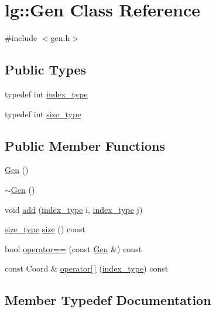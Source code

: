 \hypertarget{classlg_1_1Gen}{}\section{lg\+:\+:Gen Class Reference}
\label{classlg_1_1Gen}


{\ttfamily \#include $<$gen.\+h$>$}

\subsection*{Public Types}
\begin{DoxyCompactItemize}
\item 
typedef int \hyperlink{classlg_1_1Gen_a3a4bd3c1cacde31b1b181be8fdd9d81e}{index\+\_\+type}
\item 
typedef int \hyperlink{classlg_1_1Gen_ae8c2f6b6ba291d5c24cfc9f3d24789b8}{size\+\_\+type}
\end{DoxyCompactItemize}
\subsection*{Public Member Functions}
\begin{DoxyCompactItemize}
\item 
\hyperlink{classlg_1_1Gen_a33423152405010c7a733a17aaec8a9c6}{Gen} ()
\item 
\hyperlink{classlg_1_1Gen_a527d2e9ac6e2f05071f0c148d7376f91}{$\sim$\+Gen} ()
\item 
void \hyperlink{classlg_1_1Gen_a3fd2f13a308fd1009839ca80b94370e5}{add} (\hyperlink{classlg_1_1Gen_a3a4bd3c1cacde31b1b181be8fdd9d81e}{index\+\_\+type} i, \hyperlink{classlg_1_1Gen_a3a4bd3c1cacde31b1b181be8fdd9d81e}{index\+\_\+type} j)
\item 
\hyperlink{classlg_1_1Gen_ae8c2f6b6ba291d5c24cfc9f3d24789b8}{size\+\_\+type} \hyperlink{classlg_1_1Gen_ae3d573f57b359a51dd1849d3976d43cd}{size} () const 
\item 
bool \hyperlink{classlg_1_1Gen_a004534f31f08a0c47627f4287e81d640}{operator==} (const \hyperlink{classlg_1_1Gen}{Gen} \&) const 
\item 
const Coord \& \hyperlink{classlg_1_1Gen_ad59885d3afc595e8aed53ccbc4cc4380}{operator\mbox{[}$\,$\mbox{]}} (\hyperlink{classlg_1_1Gen_a3a4bd3c1cacde31b1b181be8fdd9d81e}{index\+\_\+type}) const 
\end{DoxyCompactItemize}


\subsection{Member Typedef Documentation}
